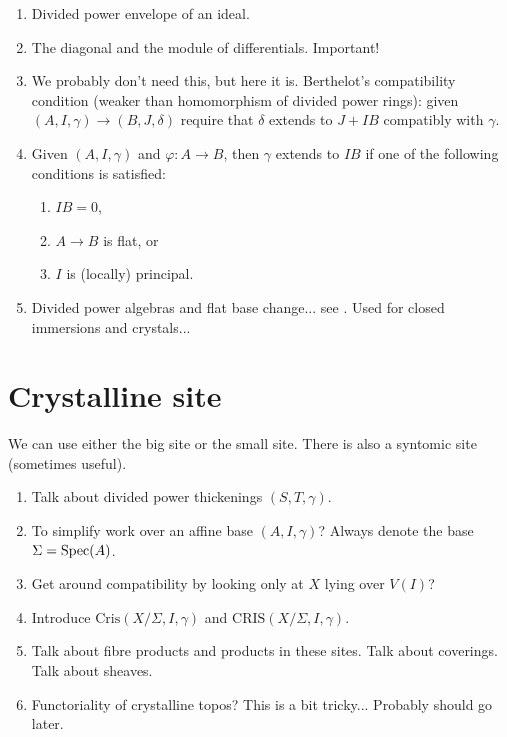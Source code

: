 \begin{enumerate}
\item Divided power envelope of an ideal.
\item The diagonal and the module of differentials. Important!
\item We probably don't need this, but here it is.
Berthelot's compatibility condition (weaker than homomorphism
of divided power rings): given $(A, I, \gamma) \to (B, J, \delta)$
require that $\delta$ extends to $J + IB$ compatibly with $\gamma$.
\item Given $(A, I, \gamma)$ and $\varphi : A \to B$, then $\gamma$
extends to $IB$ if one of the following conditions is satisfied:
\begin{enumerate}
\item $IB = 0$,
\item $A \to B$ is flat, or
\item $I$ is (locally) principal.
\end{enumerate}
\item Divided power algebras and flat base change... see
\cite[Proposition 2.1.7]{dJ-crystalline}. Used for closed immersions
and crystals...
\end{enumerate}





\section{Crystalline site}
\label{section-site}

\noindent
We can use either the big site or the small site.
There is also a syntomic site (sometimes useful).

\begin{enumerate}
\item Talk about divided power thickenings $(S, T, \gamma)$.
\item To simplify work over an affine base $(A, I, \gamma)$?
Always denote the base $\Sigma = \mathop{\rm Spec}(A)$.
\item Get around compatibility by looking only at $X$ lying over
$V(I)$?
\item Introduce $\text{Cris}(X/\Sigma, I, \gamma)$ and
$\text{CRIS}(X/\Sigma, I, \gamma)$.
\item Talk about fibre products and products in these sites.
Talk about coverings. Talk about sheaves.
\item Functoriality of crystalline topos? This is a bit tricky...
Probably should go later.
\end{enumerate}






